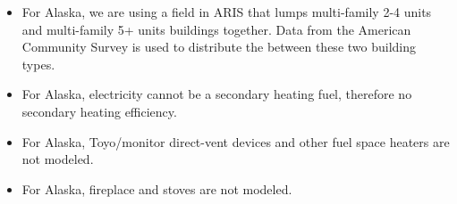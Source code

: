 \begin{itemize}
\item For Alaska, we are using a field in ARIS that lumps multi-family 2-4 units and multi-family 5+ units buildings together. Data from the American Community Survey is used to distribute the between these two building types.
\item For Alaska, electricity cannot be a secondary heating fuel, therefore no secondary heating efficiency.
\item For Alaska, Toyo/monitor direct-vent devices and other fuel space heaters are not modeled.
\item For Alaska, fireplace and stoves are not modeled.
\end{itemize}
